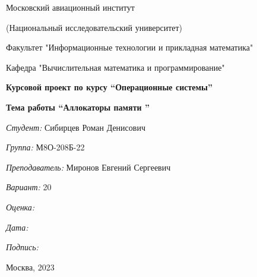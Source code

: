 \documentclass[a4paper, 12pt]{article}
\begin{document}
\thispagestyle{empty}	
\begin{center}
	Московский авиационный институт
	
	(Национальный исследовательский университет)
	
	Факультет "Информационные технологии и прикладная математика"
	
	Кафедра "Вычислительная математика и программирование"
	
\end{center}
\vspace{40ex}
\begin{center}
	\textbf{\large{Курсовой проект по курсу \linebreak \textquotedblleft Операционные системы\textquotedblright}}

    \vspace{1ex}    
    \textbf{\large{Тема работы \linebreak \textquotedblleft Аллокаторы памяти \textquotedblright}}
\end{center}
\vspace{29ex}
\begin{flushright}
	\textit{Студент: } Сибирцев Роман Денисович
	
	\vspace{2ex}
	\textit{Группа: } М8О-208Б-22
	
	\vspace{2ex}
	\textit{Преподаватель: } Миронов Евгений Сергеевич
	
	\vspace{2ex}
	\textit{Вариант: } 20
	
	\vspace{2ex}
	\textit{Оценка: } \underline{\quad\quad\quad\quad\quad\quad}
	
	 \vspace{2ex}
	\textit{Дата: } \underline{\quad\quad\quad\quad\quad\quad}
	
	\vspace{2ex}
	\textit{Подпись: } \underline{\quad\quad\quad\quad\quad\quad}
	
\end{flushright}

\vspace{5ex}

\begin{vfill}
	\begin{center}
		Москва, 2023
	\end{center}	
\end{vfill}
\newpage

\begingroup
\color{black}
\tableofcontents\newpage
\endgroup
\end{document}
